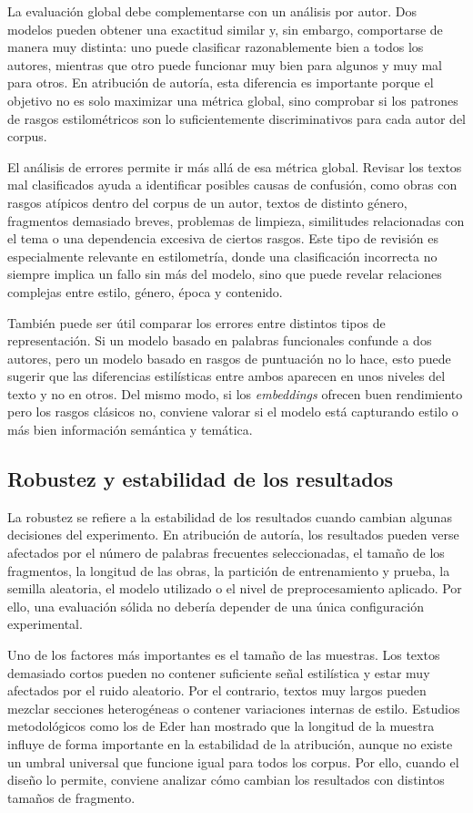 \documentclass[IB]{TFUOC}%
\begin{document}
La evaluación global debe complementarse con un análisis por autor. Dos modelos pueden obtener una exactitud similar y, sin embargo, comportarse de manera muy distinta: uno puede clasificar razonablemente bien a todos los autores, mientras que otro puede funcionar muy bien para algunos y muy mal para otros. En atribución de autoría, esta diferencia es importante porque el objetivo no es solo maximizar una métrica global, sino comprobar si los patrones de rasgos estilométricos son lo suficientemente discriminativos para cada autor del corpus.

El análisis de errores permite ir más allá de esa métrica global. Revisar los textos mal clasificados ayuda a identificar posibles causas de confusión, como obras con rasgos atípicos dentro del corpus de un autor, textos de distinto género, fragmentos demasiado breves, problemas de limpieza, similitudes relacionadas con el tema o una dependencia excesiva de ciertos rasgos. Este tipo de revisión es especialmente relevante en estilometría, donde una clasificación incorrecta no siempre implica un fallo sin más del modelo, sino que puede revelar relaciones complejas entre estilo, género, época y contenido.

También puede ser útil comparar los errores entre distintos tipos de representación. Si un modelo basado en palabras funcionales confunde a dos autores, pero un modelo basado en rasgos de puntuación no lo hace, esto puede sugerir que las diferencias estilísticas entre ambos aparecen en unos niveles del texto y no en otros. Del mismo modo, si los \textit{embeddings} ofrecen buen rendimiento pero los rasgos clásicos no, conviene valorar si el modelo está capturando estilo o más bien información semántica y temática.

\subsection{Robustez y estabilidad de los resultados}

La robustez se refiere a la estabilidad de los resultados cuando cambian algunas decisiones del experimento. En atribución de autoría, los resultados pueden verse afectados por el número de palabras frecuentes seleccionadas, el tamaño de los fragmentos, la longitud de las obras, la partición de entrenamiento y prueba, la semilla aleatoria, el modelo utilizado o el nivel de preprocesamiento aplicado. Por ello, una evaluación sólida no debería depender de una única configuración experimental.

Uno de los factores más importantes es el tamaño de las muestras. Los textos demasiado cortos pueden no contener suficiente señal estilística y estar muy afectados por el ruido aleatorio. Por el contrario, textos muy largos pueden mezclar secciones heterogéneas o contener variaciones internas de estilo. Estudios metodológicos como los de Eder han mostrado que la longitud de la muestra influye de forma importante en la estabilidad de la atribución, aunque no existe un umbral universal que funcione igual para todos los corpus\cite{eder2015does}. Por ello, cuando el diseño lo permite, conviene analizar cómo cambian los resultados con distintos tamaños de fragmento.
\end{document}
